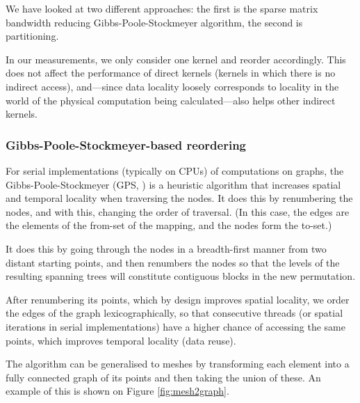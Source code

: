 We have looked at two different approaches: the first is the sparse matrix
bandwidth reducing Gibbs-Poole-Stockmeyer algorithm, the second is partitioning.

In our measurements, we only consider one kernel and reorder accordingly. This
does not affect the performance of direct kernels (kernels in which there is no
indirect access), and---since data locality loosely corresponds to locality in
the world of the physical computation being calculated---also helps other
indirect kernels.

\subsubsection{Gibbs-Poole-Stockmeyer-based reordering}

For serial implementations (typically on CPUs) of computations on graphs, the
Gibbs-Poole-Stockmeyer (GPS, \cite{gps}) is a heuristic algorithm that increases
spatial and temporal locality when traversing the nodes. It does this by
renumbering the nodes, and with this, changing the order of traversal. (In this
case, the edges are the elements of the from-set of the mapping, and the nodes
form the to-set.)

It does this by going through the nodes in a breadth-first manner from two
distant starting points, and then renumbers the nodes so that the levels of the
resulting spanning trees will constitute contiguous blocks in the new
permutation.

After renumbering its points, which by design improves spatial locality, we
order the edges of the graph lexicographically, so that consecutive threads (or
spatial iterations in serial implementations) have a higher chance of accessing
the same points, which improves temporal locality (data reuse).

The algorithm can be generalised to meshes by transforming each element into a
fully connected graph of its points and then taking the union of these. An
example of this is shown on Figure \ref{fig:mesh2graph}.

